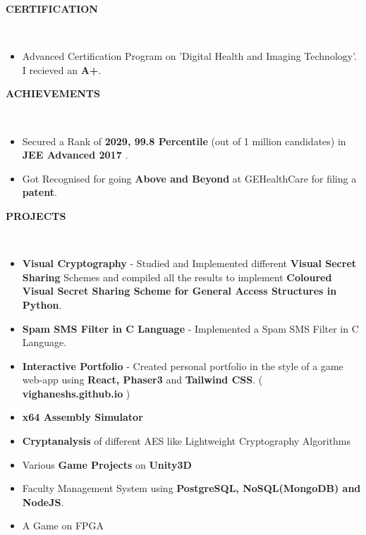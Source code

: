 \documentclass[a4paper,10pt]{article}
\newcommand{\lsep}{-0.6cm}
\newcommand{\resheading}[1]{{\small \colorbox{mygrey}{\begin{minipage}{0.975\textwidth}{\textbf{#1 \vphantom{p\^{E}}}}\end{minipage}}}}
\begin{document}
\resheading{\textbf{CERTIFICATION} }\\[\lsep]
\vspace{1.0pt}
\begin{itemize}
\item Advanced Certification Program on 'Digital Health and Imaging Technology'. I recieved an \textbf{A+}. 
\end{itemize}

\resheading{\textbf{ACHIEVEMENTS} }\\[\lsep]
\vspace{1.0pt}

\begin{itemize}
\setlength{\itemsep}{1pt}
\setlength{\parskip}{0pt}
\setlength{\parsep}{0pt}
\item Secured a Rank of \textbf{2029, 99.8 Percentile} (out of 1 million candidates) in \textbf{JEE Advanced 2017} .
\item Got Recognised for going \textbf{Above and Beyond} at GEHealthCare for filing a \textbf{patent}.
\end{itemize}

\resheading{\textbf{PROJECTS} }\\[\lsep]
\vspace{1.0pt}
\begin{itemize}
\setlength{\itemsep}{1pt}
\setlength{\parskip}{0pt}
\setlength{\parsep}{0pt}
\item \textbf{Visual Cryptography} - Studied and Implemented different \textbf{Visual Secret Sharing} Schemes and compiled all the results to implement \textbf{Coloured Visual Secret Sharing Scheme for General Access Structures in Python}. 	
\item \textbf{Spam SMS Filter in C Language} - Implemented a Spam SMS Filter in C Language.
\item \textbf{Interactive Portfolio} - Created personal portfolio in the style of a game web-app using \textbf{React, Phaser3} and \textbf{Tailwind CSS}. (\textbf{ vighaneshs.github.io} )
\item \textbf{x64 Assembly Simulator}
\item \textbf{Cryptanalysis} of different AES like Lightweight Cryptography Algorithms
\item Various \textbf{Game Projects} on \textbf{Unity3D}
\item Faculty Management System using \textbf{PostgreSQL, NoSQL(MongoDB) and NodeJS}.
\item A Game on FPGA
\end{itemize}
\end{document}
